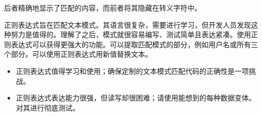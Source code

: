后者精确地显示了匹配的内容，而前者将其隐藏在转义字符中。

正则表达式旨在匹配文本模式。其语言很复杂，需要进行学习，但开发人员发现这种努力是值得的。理解了之后，模式就很容易编写、测试简单且表达紧凑。使用正则表达式可以获得更强大的功能。可以提取匹配模式的部分，例如用户名或所有三个部分。可以使用正则表达式用新值替换文本。


\begin{itemize}
\item
正则表达式值得学习和使用；确保定制的文本模式匹配代码的正确性是一项挑战。

\item
正则表达式表达能力很强，但读写却很困难；请使用能想到的每种数据变体。对其进行彻底测试。
\end{itemize}






